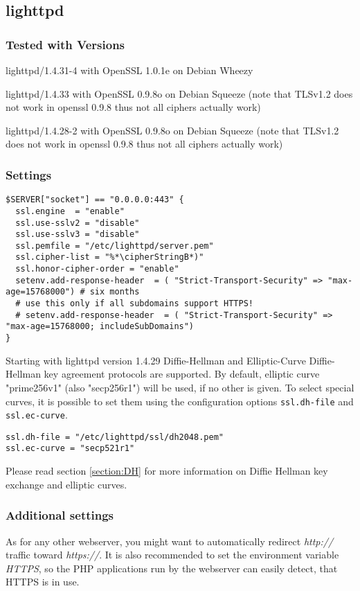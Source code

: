 \subsection{lighttpd}

\subsubsection{Tested with Versions}
\begin{itemize*}
  \item lighttpd/1.4.31-4 with OpenSSL 1.0.1e on Debian Wheezy
  \item lighttpd/1.4.33 with OpenSSL 0.9.8o on Debian Squeeze (note that TLSv1.2 does not work in openssl 0.9.8 thus not all ciphers actually work)
  \item lighttpd/1.4.28-2 with OpenSSL 0.9.8o on Debian Squeeze (note that TLSv1.2 does not work in openssl 0.9.8 thus not all ciphers actually work)
\end{itemize*}


\subsubsection{Settings}
\begin{lstlisting}
$SERVER["socket"] == "0.0.0.0:443" {
  ssl.engine  = "enable"
  ssl.use-sslv2 = "disable"
  ssl.use-sslv3 = "disable"
  ssl.pemfile = "/etc/lighttpd/server.pem"
  ssl.cipher-list = "%*\cipherStringB*)"
  ssl.honor-cipher-order = "enable"
  setenv.add-response-header  = ( "Strict-Transport-Security" => "max-age=15768000") # six months
  # use this only if all subdomains support HTTPS!
  # setenv.add-response-header  = ( "Strict-Transport-Security" => "max-age=15768000; includeSubDomains")
}
\end{lstlisting}

Starting with lighttpd version 1.4.29 Diffie-Hellman and Elliptic-Curve Diffie-Hellman key agreement protocols are supported.
By default, elliptic curve "prime256v1" (also "secp256r1") will be used, if no other is given.
To select special curves, it is possible to set them using the configuration options \verb|ssl.dh-file| and \verb|ssl.ec-curve|.
\begin{lstlisting}
ssl.dh-file = "/etc/lighttpd/ssl/dh2048.pem"
ssl.ec-curve = "secp521r1"
\end{lstlisting}
Please read section \ref{section:DH} for more information on Diffie Hellman key exchange and elliptic curves.

\subsubsection{Additional settings}
As for any other webserver, you might want to automatically redirect \emph{http://}
traffic toward \emph{https://}. It is also recommended to set the environment variable
\emph{HTTPS}, so the PHP applications run by the webserver can easily detect,
that HTTPS is in use.

